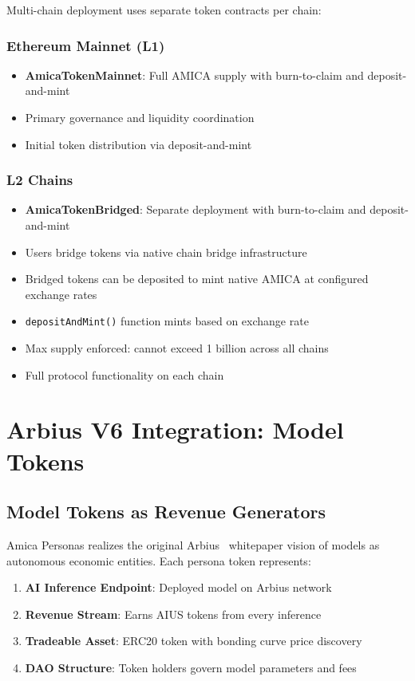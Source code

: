 \documentclass{article}
\begin{document}
Multi-chain deployment uses separate token contracts per chain:

\subsubsection{Ethereum Mainnet (L1)}
\begin{itemize}
    \item \textbf{AmicaTokenMainnet}: Full AMICA supply with burn-to-claim and deposit-and-mint
    \item Primary governance and liquidity coordination
    \item Initial token distribution via deposit-and-mint
\end{itemize}

\subsubsection{L2 Chains}
\begin{itemize}
    \item \textbf{AmicaTokenBridged}: Separate deployment with burn-to-claim and deposit-and-mint
    \item Users bridge tokens via native chain bridge infrastructure
    \item Bridged tokens can be deposited to mint native AMICA at configured exchange rates
    \item \texttt{depositAndMint()} function mints based on exchange rate
    \item Max supply enforced: cannot exceed 1 billion across all chains
    \item Full protocol functionality on each chain
\end{itemize}

\section{Arbius V6 Integration: Model Tokens}

\subsection{Model Tokens as Revenue Generators}

Amica Personas realizes the original Arbius~\cite{arbius2023} whitepaper vision of models as autonomous economic entities. Each persona token represents:

\begin{enumerate}
    \item \textbf{AI Inference Endpoint}: Deployed model on Arbius network
    \item \textbf{Revenue Stream}: Earns AIUS tokens from every inference
    \item \textbf{Tradeable Asset}: ERC20 token with bonding curve price discovery
    \item \textbf{DAO Structure}: Token holders govern model parameters and fees
\end{enumerate}
\end{document}
